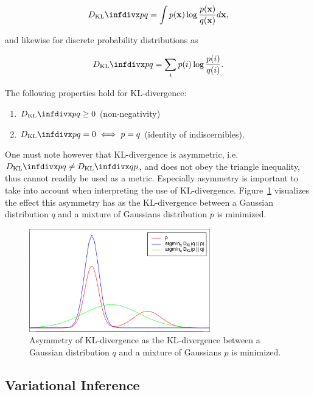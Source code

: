 
$$\dkl{p}{q} = \int p(\bx) \log \frac{p(\bx)}{q(\bx)} d\bx,$$

and likewise for discrete probability distributions as

$$\dkl{p}{q} = \sum_{i} p(i) \log \frac{p(i)}{q(i)}.$$

The following properties hold for KL-divergence:

\begin{enumerate}
\item $\dkl{p}{q} \geq 0$ (non-negativity)
\item $\dkl{p}{q} = 0 \iff p = q$ (identity of indiscernibles).
\end{enumerate}

One must note however that KL-divergence is asymmetric, i.e. $\dkl{p}{q} \neq \dkl{q}{p}$, and does not obey the triangle inequality, thus cannot readily be used as a metric. Especially asymmetry is important to take into account when interpreting the use of KL-divergence. Figure~\ref{fig:kl_divergence} visualizes the effect this asymmetry has as the KL-divergence between a Gaussian distribution $q$ and a mixture of Gaussians distribution $p$ is minimized.

\begin{figure}[!htb]
  \centering
  \includegraphics[width=0.7\textwidth]{images/kl_divergence.png}
  \caption{Asymmetry of KL-divergence as the KL-divergence between a Gaussian distribution $q$ and a mixture of Gaussians $p$ is minimized.}
  \label{fig:kl_divergence}
\end{figure}

\subsection{Variational Inference}
\label{subsection:variational_inference}

